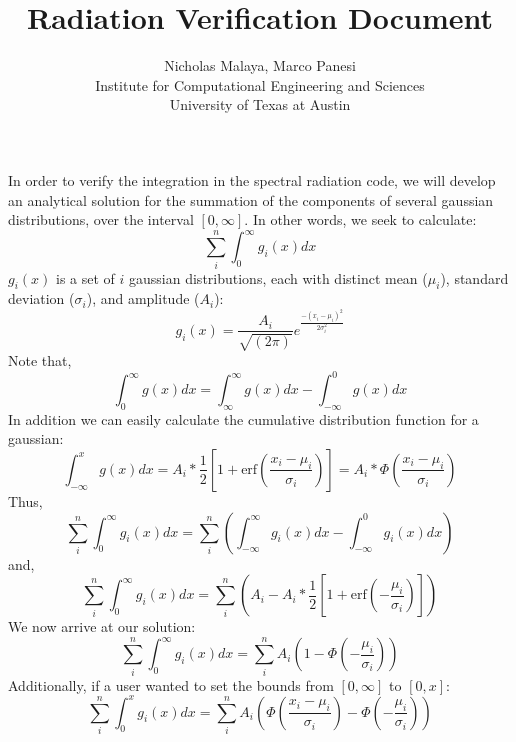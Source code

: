 \documentclass{article}
\title{\bf{Radiation Verification Document}}
\author{Nicholas Malaya, Marco Panesi \\ Institute for Computational Engineering and Sciences \\ University of Texas at Austin} \date{}
\begin{document}
\maketitle

In order to verify the integration in the spectral radiation code, we will develop an analytical solution for 
the summation of the components of several gaussian distributions, over the interval $[0,\infty]$. 
\newline
\newline
In other words, we seek to calculate:
\begin{equation}
  \sum_i^n \int^\infty_0 g_i(x) dx
\end{equation}
\newline
\newline
$g_i(x)$ is a set of $i$ gaussian distributions, each with distinct mean ($\mu_i$), standard deviation ($\sigma_i$), and amplitude ($A_i$):
\begin{equation}
  g_i(x) = \frac{A_i}{\sqrt{(2 \pi)}}e^{\frac{-(x_i-\mu_i)^2}{2 \sigma_i^2}}
\end{equation}
\newline
\newline
Note that,
\begin{equation}
  \int^\infty_0 g(x) dx = \int^\infty_\infty g(x) dx  -  \int^0_{-\infty} g(x)dx
\end{equation}
In addition we can easily calculate the cumulative distribution function for a gaussian:
\begin{equation}
  \int^x_{-\infty} g(x) dx = A_i * \frac12 [1+\textrm{erf}(\frac{x_i-\mu_i}{\sigma_i})] = A_i * \Phi(\frac{x_i-\mu_i}{\sigma_i})
\end{equation}
Thus, 
\begin{equation}
  \sum_i^n \int^\infty_0 g_i(x) dx = \sum_i^n ( \int^\infty_{-\infty} g_i(x) dx  -  \int^0_{-\infty} g_i(x)dx)
\end{equation}
and,
\begin{equation}
  \sum_i^n \int^\infty_0 g_i(x) dx = \sum_i^n ( A_i  - A_i * \frac12 [1+\textrm{erf}(-\frac{\mu_i}{\sigma_i})])
\end{equation}
We now arrive at our solution:
\begin{equation}
  \sum_i^n \int^\infty_0 g_i(x) dx = \sum_i^n A_i ( 1  -  \Phi(-\frac{\mu_i}{\sigma_i}))
\end{equation}
\newline
\newline
Additionally, if a user wanted to set the bounds from $[0,\infty]$ to $[0,x]$:
\begin{equation}
  \sum_i^n \int^x_0 g_i(x) dx = \sum_i^n A_i ( \Phi(\frac{x_i-\mu_i}{\sigma_i}) - \Phi(-\frac{\mu_i}{\sigma_i}))
\end{equation}
\end{document}
